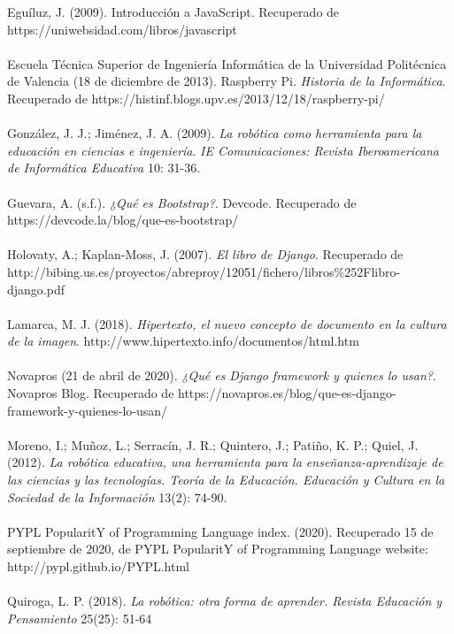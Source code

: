 \documentclass{report}
\begin{document}
Eguíluz, J. (2009). Introducción a JavaScript. Recuperado de https://uniwebsidad.com/libros/javascript
\\
\\
Escuela Técnica Superior de Ingeniería Informática de la Universidad Politécnica de Valencia (18 de diciembre de 2013). Raspberry Pi.  \textit{Historia de la Informática}. Recuperado de https://histinf.blogs.upv.es/2013/12/18/raspberry-pi/
\\
\\
González, J. J.; Jiménez, J. A. (2009). \textit{La robótica como herramienta para la educación en ciencias e ingeniería}. \textit{IE Comunicaciones: Revista Iberoamericana de Informática Educativa} 10: 31-36.
\\
\\
Guevara, A. (s.f.). \textit{¿Qué es Bootstrap?}. Devcode. Recuperado de https://devcode.la/blog/que-es-bootstrap/
\\
\\
Holovaty, A.; Kaplan-Moss, J. (2007).  \textit{El libro de Django}. Recuperado de http://bibing.us.es/proyectos/abreproy/12051/fichero/libros\%252Flibro-django.pdf
\\
\\
Lamarca, M. J. (2018). \textit{Hipertexto, el nuevo concepto de documento en la cultura de la imagen}. http://www.hipertexto.info/documentos/html.htm
\\
\\
Novapros (21 de abril de 2020). \textit{¿Qué es Django framework y quienes lo usan?}. Novapros Blog. Recuperado de https://novapros.es/blog/que-es-django-framework-y-quienes-lo-usan/
\\
\\
Moreno, I.; Muñoz, L.; Serracín, J. R.; Quintero, J.; Patiño, K. P.; Quiel, J. (2012).\textit{ La robótica educativa, una herramienta para la enseñanza-aprendizaje de las ciencias y las tecnologías. Teoría de la Educación. Educación y Cultura en la Sociedad de la Información} 13(2): 74-90.
\\
\\
PYPL PopularitY of Programming Language index. (2020). Recuperado 15 de septiembre de 2020, de PYPL PopularitY of Programming Language website: http://pypl.github.io/PYPL.html
\\
\\
Quiroga, L. P. (2018). \textit{La robótica: otra forma de aprender. Revista Educación y Pensamiento} 25(25): 51-64
\\
\\
\end{document}

